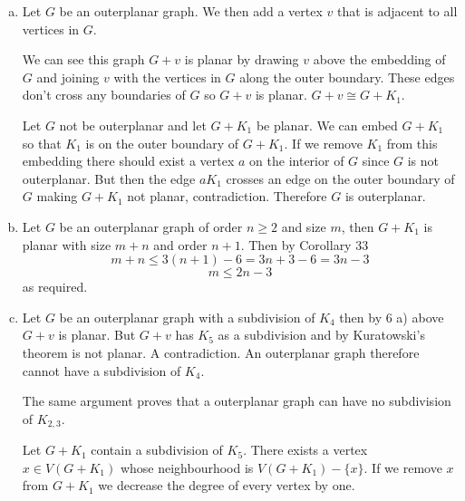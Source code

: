 \begin{enumerate}[(a)]
    \item Let $G$ be an outerplanar graph. We then add a vertex $v$ 
    that is adjacent to all vertices in $G$. 
    
    We can see this graph $G+v$ is planar by drawing $v$
    above the embedding of $G$ and joining $v$ with the vertices in $G$ 
    along the outer boundary. These edges don't cross any boundaries of 
    $G$ so $G+v$ is planar.  $G+v \cong G+K_1$.

    Let $G$ not be outerplanar and let $G+K_1$ be planar. We can embed
    $G+K_1$ so that $K_1$ is on the outer boundary of $G+K_1$.
    If we remove $K_1$ from this embedding there should exist a
    vertex $a$ on the interior of $G$ since $G$ is not outerplanar.
    But then the edge $aK_1$ crosses an edge on the outer boundary
    of $G$ making $G+K_1$ not planar, contradiction. Therefore
    $G$ is outerplanar.

    \item Let $G$ be an outerplanar graph of order $n \ge 2$ and size $m$, 
    then $G+K_1$ is planar with size $m+n$ and order $n+1$. Then
    by Corollary 33 
        $$ m+n \le 3(n+1) - 6 = 3n+3-6 = 3n-3$$
        $$m \le 2n-3$$
        as required.

    \item Let $G$ be an outerplanar graph with a subdivision of $K_4$ then by
    6 a) above $G+v$ is planar. But $G+v$ has $K_5$ as a subdivision 
    and by Kuratowski's theorem is not planar. A contradiction. An
    outerplanar graph therefore cannot have a subdivision of $K_4$. 

    The same argument proves that a outerplanar graph can have no
    subdivision of $K_{2,3}$.

    Let $G+K_1$ contain a subdivision of $K_5$. There exists a vertex 
    $x \in V(G+K_1)$ whose neighbourhood is $V(G+K_1) - \{x\}$. 
    If we remove $x$ from $G+K_1$ we decrease the degree of every
    vertex by one.
\end{enumerate}
